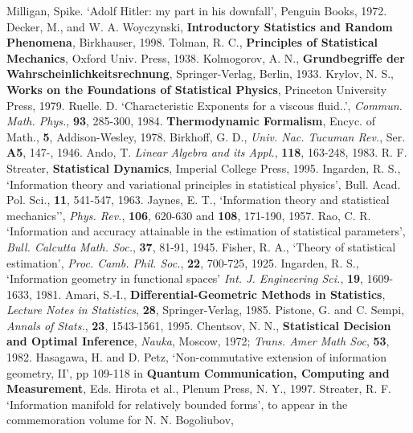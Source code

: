 \begin{thebibliography}{99}
 Milligan, Spike. `Adolf Hitler: my part in his downfall',
Penguin Books, 1972.
 Decker, M., and W. A. Woyczynski, {\bf Introductory
Statistics and Random Phenomena}, Birkhauser, 1998.
 Tolman, R. C., {\bf Principles of Statistical Mechanics},
Oxford Univ. Press, 1938.
 Kolmogorov, A. N., {\bf Grundbegriffe der
Wahrscheinlichkeitsrechnung}, Springer-Verlag, Berlin, 1933.
 Krylov, N. S., {\bf Works on the Foundations of
Statistical Physics}, Princeton University Press, 1979.
 Ruelle. D. `Characteristic Exponents for a viscous
fluid..', {\em Commun. Math. Phys.}, {\bf 93}, 285-300, 1984.
{\bf Thermodynamic Formalism}, Encyc. of Math., {\bf 5},
Addison-Wesley, 1978.
 Birkhoff, G. D., {\em Univ. Nac. Tucuman Rev.}, Ser.
{\bf A5}, 147-, 1946.
 Ando, T. {\em Linear Algebra and its Appl.}, {\bf 118},
163-248, 1983.
 R. F. Streater, {\bf Statistical Dynamics}, Imperial
College Press, 1995.
 Ingarden, R. S., `Information theory and variational
principles in statistical physics', {Bull. Acad. Pol. Sci.}, {\bf 11},
541-547, 1963.
 Jaynes, E. T., `Information theory and
statistical mechanics'', {\em Phys. Rev.}, {\bf 106}, 620-630 and
{\bf 108}, 171-190, 1957.
 Rao, C. R. `Information and accuracy attainable in the
estimation of statistical parameters', {\em Bull. Calcutta Math. Soc.},
{\bf 37}, 81-91, 1945.
 Fisher, R. A., `Theory of statistical estimation',
{\em Proc. Camb. Phil. Soc.}, {\bf 22}, 700-725, 1925.
 Ingarden, R. S., `Information geometry in functional
spaces' {\em Int. J. Engineering Sci.}, {\bf 19}, 1609-1633, 1981.
 Amari, S.-I., {\bf Differential-Geometric Methods in
Statistics}, {\em Lecture Notes in Statistics}, {\bf 28}, Springer-Verlag,
1985.
 Pistone, G. and C. Sempi, {\em Annals of Stats.}, {\bf 23},
1543-1561, 1995.
 Chentsov, N. N., {\bf Statistical Decision and Optimal
Inference}, {\em Nauka}, Moscow, 1972; {\em Trans. Amer Math Soc}, {\bf 53},
1982.
 Hasagawa, H. and D. Petz, `Non-commutative extension of
information geometry, II', pp 109-118 in
{\bf Quantum Communication, Computing
 and Measurement}, Eds. Hirota et al., Plenum Press, N. Y., 1997.
 Streater, R. F. `Information manifold for relatively
bounded forms', to appear in the commemoration volume for N. N. Bogoliubov,

\end{thebibliography}
